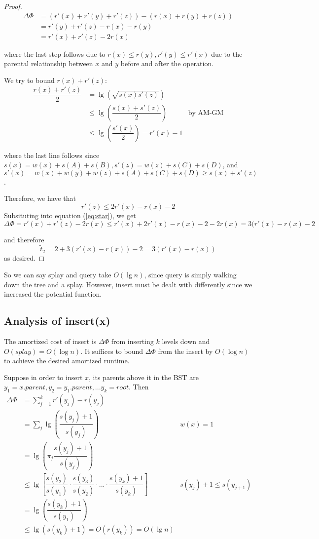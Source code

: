 \documentclass[11pt]{article}
\begin{document}
\begin{proof}
\begin{align}
    \nonumber\Delta\Phi &= (r'(x) + r'(y) + r'(z)) - (r(x) + r(y) + r(z))\\
    \nonumber&= r'(y) + r'(z) - r(x) - r(y)\\
    &= r'(x) + r'(z) - 2r(x) \label{eq:star}
\end{align}

where the last step follows due to $r(x) \le r(y), r'(y) \le r'(x)$ due to the parental relationship between $x$ and $y$ before and after the operation.

We try to bound $r(x)+r'(z)$:
\begin{align*}
    \dfrac{r(x) + r'(z)}{2} &= \lg\left(\sqrt{s(x)s'(z)}\right)\\
    &\le \lg\left(\dfrac{s(x)+s'(z)}{2}\right) &\text{by AM-GM}\\
    &\le  \lg\left(\dfrac{s'(x)}{2}\right) = r'(x) - 1
\end{align*}

where the last line follows since $s(x) = w(x) + s(A) + s(B), s'(z) = w(z) + s(C) + s(D)$, and $s'(x) = w(x) + w(y) + w(z) + s(A) + s(C) + s(D) \ge s(x) + s'(z)$.

Therefore, we have that \[r'(z) \le 2r'(x) - r(x) - 2\]
Subsituting into equation (\ref{eq:star}), we get
\[\Delta \Phi = r'(x) + r'(z)-2r(x) \le r'(x) + 2r'(x) - r(x) - 2-2r(x) = 3(r'(x) - r(x) -2\]

and therefore \[\tilde{t}_2 = 2 + 3(r'(x) - r(x)) - 2 = 3(r'(x)-r(x))\]
as desired.
\end{proof}

So we can say splay and query take $O(\lg n)$, since query is simply walking down the tree and a splay. However, insert must be dealt with differently since we increased the potential function. 

\subsection{Analysis of insert(x)}

The amortized cost of insert is $\Delta\Phi$ from inserting $k$ levels down and $O(splay) = O(\log n)$. It suffices to bound $\Delta\Phi$ from the insert by $O(\log n)$ to achieve the desired amortized runtime.

Suppose in order to insert $x$, its parents above it in the BST are $y_1 = x.parent, y_2 = y_1.parent, ... y_k=root$. Then
\begin{align*}
    \Delta\Phi &= \sum_{j=1}^k r'(y_j) - r(y_j)\\
    &= \sum_j \lg\left(\dfrac{s(y_j) + 1}{s(y_j)}\right) &w(x) = 1\\
    &= \lg\left(\pi_j\dfrac{s(y_j)+1}{s(y_j)}\right)\\
    &\le \lg\left[\dfrac{s(y_2)}{s(y_1)}\cdot\dfrac{s(y_3)}{s(y_2)}\cdot ... \cdot \dfrac{s(y_k)+1}{s(y_k)}\right]
    &s(y_j) + 1 \le s(y_{j+1})\\
    &= \lg\left(\dfrac{s(y_k)+1}{s(y_1)}\right)\\
    &\le \lg (s(y_k) + 1) = O(r(y_k)) = O(\lg n)
\end{align*}
\end{document}
